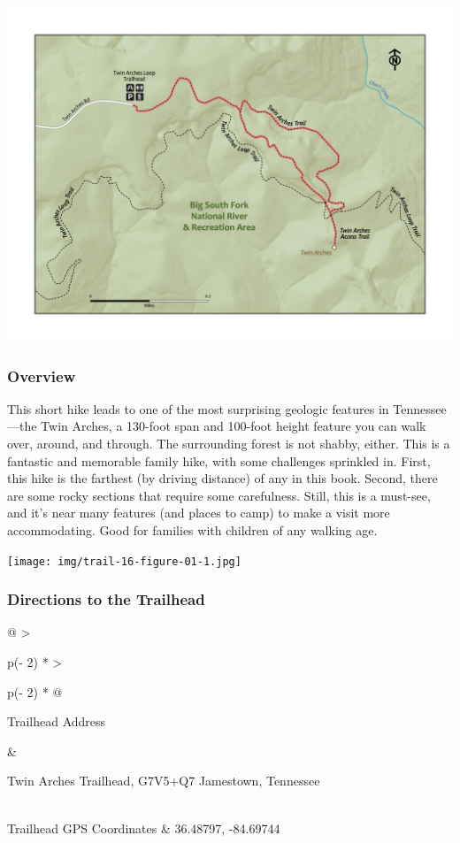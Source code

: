 \documentclass[
  letterpaper,
  DIV=11,
  numbers=noendperiod]{scrartcl}
\begin{document}
\includegraphics{maps/trail-17-map.jpeg}

\hypertarget{overview-16}{%
\subsubsection{Overview}\label{overview-16}}

This short hike leads to one of the most surprising geologic features in
Tennessee---the Twin Arches, a 130-foot span and 100-foot height feature
you can walk over, around, and through. The surrounding forest is not
shabby, either. This is a fantastic and memorable family hike, with some
challenges sprinkled in. First, this hike is the farthest (by driving
distance) of any in this book. Second, there are some rocky sections
that require some carefulness. Still, this is a must-see, and it's near
many features (and places to camp) to make a visit more accommodating.
Good for families with children of any walking age.

\texttt{[image: img/trail-16-figure-01-1.jpg]}

\hypertarget{directions-to-the-trailhead-16}{%
\subsubsection{Directions to the
Trailhead}\label{directions-to-the-trailhead-16}}

\begin{longtable}[]{@{}
  >{\raggedright\arraybackslash}p{(\columnwidth - 2\tabcolsep) * }
  >{\raggedright\arraybackslash}p{(\columnwidth - 2\tabcolsep) * }@{}}
\toprule\noalign{}
\begin{minipage}[b]{\linewidth}\raggedright
Trailhead Address
\end{minipage} & \begin{minipage}[b]{\linewidth}\raggedright
Twin Arches Trailhead, G7V5+Q7 Jamestown, Tennessee
\end{minipage} \\
\midrule\noalign{}
\endhead
\bottomrule\noalign{}
\endlastfoot
Trailhead GPS Coordinates & 36.48797, -84.69744 \\
\end{longtable}
\end{document}
